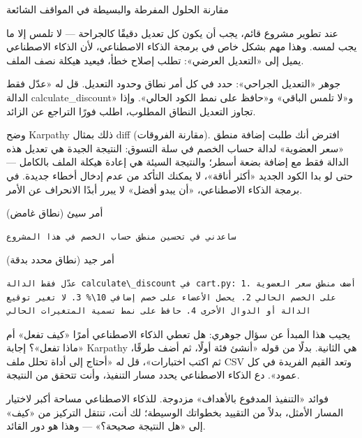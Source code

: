 \begin{center}\small\color{gray}مقارنة الحلول المفرطة والبسيطة في المواقف الشائعة\end{center}


عند تطوير مشروع قائم، يجب أن يكون كل تعديل دقيقًا كالجراحة — لا تلمس إلا ما يجب لمسه. وهذا مهم بشكل خاص في برمجة الذكاء الاصطناعي، لأن الذكاء الاصطناعي يميل إلى «التعديل العرضي»: تطلب إصلاح خطأ، فيعيد هيكلة نصف الملف.

جوهر «التعديل الجراحي»: حدد في كل أمر نطاق وحدود التعديل. قل له «عدّل فقط الدالة calculate\_discount» و«لا تلمس الباقي» و«حافظ على نمط الكود الحالي». وإذا تجاوز التعديل النطاق المطلوب، اطلب فورًا التراجع عن الزائد.

وضح Karpathy ذلك بمثال diff (مقارنة الفروقات). افترض أنك طلبت إضافة منطق «سعر العضوية» لدالة حساب الخصم في سلة التسوق: النتيجة الجيدة هي تعديل هذه الدالة فقط مع إضافة بضعة أسطر؛ والنتيجة السيئة هي إعادة هيكلة الملف بالكامل — حتى لو بدا الكود الجديد «أكثر أناقة»، لا يمكنك التأكد من عدم إدخال أخطاء جديدة. في برمجة الذكاء الاصطناعي، «أن يبدو أفضل» لا يبرر أبدًا الانحراف عن الأمر.

أمر سيئ (نطاق غامض)

\begin{lstlisting}
ساعدني في تحسين منطق حساب الخصم في هذا المشروع
\end{lstlisting}

أمر جيد (نطاق محدد بدقة)

\begin{lstlisting}
عدّل فقط الدالة calculate\_discount في cart.py: 1. أضف منطق سعر العضوية على الخصم الحالي 2. يحصل الأعضاء على خصم إضافي 10\% 3. لا تغير توقيع الدالة أو الدوال الأخرى 4. حافظ على نمط تسمية المتغيرات الحالي
\end{lstlisting}


يجيب هذا المبدأ عن سؤال جوهري: هل تعطي الذكاء الاصطناعي أمرًا «كيف تفعل» أم «ماذا تفعل»؟ إجابة Karpathy هي الثانية. بدلًا من قوله «أنشئ فئة أولًا، ثم أضف طرقًا، ثم اكتب اختبارات»، قل له «أحتاج إلى أداة تحلل ملف CSV وتعد القيم الفريدة في كل عمود». دع الذكاء الاصطناعي يحدد مسار التنفيذ، وأنت تتحقق من النتيجة.

فوائد «التنفيذ المدفوع بالأهداف» مزدوجة. للذكاء الاصطناعي مساحة أكبر لاختيار المسار الأمثل، بدلاً من التقييد بخطواتك الوسيطة؛ لك أنت، تنتقل التركيز من «كيف» إلى «هل النتيجة صحيحة؟» — وهذا هو دور القائد.

